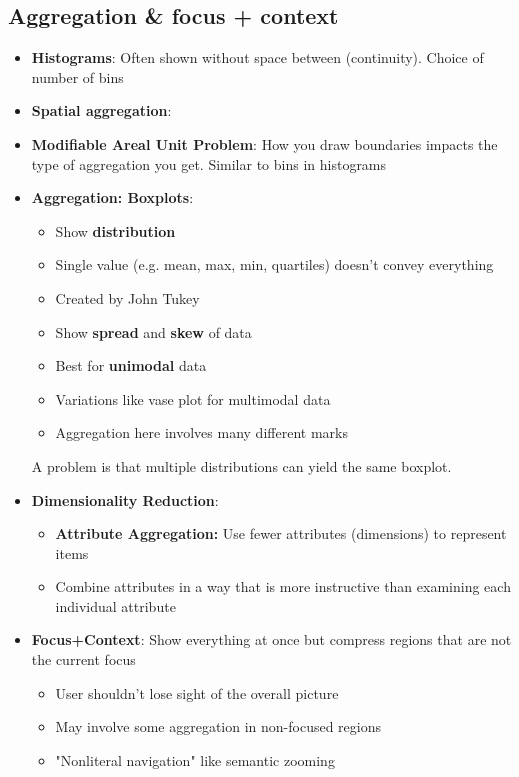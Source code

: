 \documentclass{report}
\begin{document}
    \subsection{Aggregation \& focus + context}
    \begin{itemize}
        \item \textbf{Histograms}: Often shown without space between (continuity). Choice of number of bins
            \bigbreak \noindent 
        \item \textbf{Spatial aggregation}: 
            \bigbreak \noindent 
        \item \textbf{Modifiable Areal Unit Problem}: How you draw boundaries impacts the type of aggregation you get. Similar to bins in histograms
        \item \textbf{Aggregation: Boxplots}: 
            \begin{itemize}
                \item Show \textbf{distribution}
                \item Single value (e.g. mean, max, min, quartiles) doesn't convey everything
                \item Created by John Tukey
                \item Show \textbf{spread} and \textbf{skew} of data
                \item Best for \textbf{unimodal} data
                \item Variations like vase plot for multimodal data
                \item Aggregation here involves many different marks
            \end{itemize}
            \bigbreak \noindent 
            A problem is that multiple distributions can yield the same boxplot.
        \item \textbf{Dimensionality Reduction}: 
            \begin{itemize}
                \item \textbf{Attribute Aggregation:} Use fewer attributes (dimensions) to represent items
                \item Combine attributes in a way that is more instructive than examining each individual attribute
            \end{itemize}
        \item \textbf{Focus+Context}: Show everything at once but compress regions that are not the current focus
            \begin{itemize}
                \item                 User shouldn't lose sight of the overall picture
                \item                 May involve some aggregation in non-focused regions
                \item                 "Nonliteral navigation" like semantic zooming 
             

\end{itemize}
\end{itemize}
\end{document}

